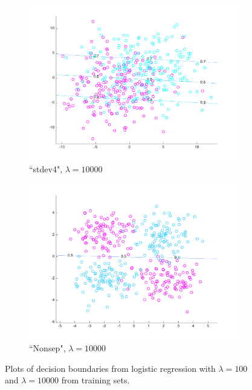 \begin{figure}[h!]
\begin{subfigure}[b]{0.22\textwidth}
	\includegraphics[scale=0.25]{hw2_1_stdev4_a_10000.pdf}
	\caption{``stdev4", $\lambda = 10000$}
    \end{subfigure}  
    \quad
    \begin{subfigure}[b]{0.22\textwidth}
	\includegraphics[scale=0.25]{hw2_1_nonsep_a_10000.pdf}
	\caption{``Nonsep", $\lambda = 10000$}
    \end{subfigure}  
    
    \caption{Plots of decision boundaries from logistic regression with $\lambda = 100$ and $\lambda = 10000$ from training sets.}  \label{fig:LR_plots_100}  
\end{figure}


